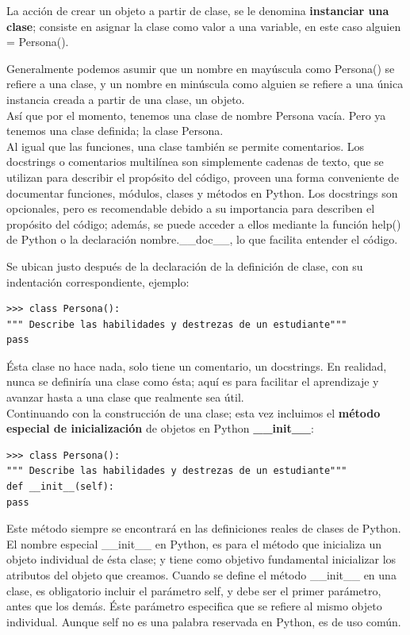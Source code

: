 La acción de crear un objeto a partir de clase, se le denomina {\bf instanciar una clase}; consiste en asignar la clase como valor a una variable, en este caso {\ttfamily alguien = Persona()}.  

Generalmente podemos asumir que un nombre en mayúscula como {\ttfamily Persona()} se refiere a una clase, y un nombre en minúscula como {\ttfamily alguien} se refiere a una única instancia creada a partir de una clase, un objeto. \\


Así que por el momento, tenemos una clase de nombre {\ttfamily Persona} vacía.  Pero ya tenemos una clase definida; la clase {\ttfamily Persona}. \\


Al igual que las funciones, una clase también se permite comentarios. Los docstrings o comentarios multilínea  son simplemente cadenas de texto, que se utilizan para describir el propósito del código,  proveen una forma conveniente de documentar funciones, módulos, clases y métodos en Python. Los docstrings son opcionales, pero es recomendable debido a su  importancia para describen el propósito del código; además,  se  puede acceder a ellos mediante la función {\ttfamily help()} de Python o la declaración  {\ttfamily nombre.\_\!\_doc\_\!\_}, lo que facilita   entender el código. 

Se ubican justo después de la declaración de la definición de clase, con su indentación correspondiente, ejemplo:

\begin{lstlisting}
>>> class Persona():
""" Describe las habilidades y destrezas de un estudiante"""
pass
\end{lstlisting}
Ésta clase no hace nada, solo tiene un comentario, un docstrings. 
En realidad, nunca se definiría una clase como ésta; aquí es para facilitar el aprendizaje y avanzar hasta a  una clase que realmente sea útil.\\

Continuando con la construcción de una clase; esta vez incluimos el {\bf método especial de inicialización} de objetos en Python {\bf {\ttfamily\_\!\_init\_\!\_}}:

\begin{lstlisting}
>>> class Persona():
""" Describe las habilidades y destrezas de un estudiante"""
def __init__(self):
pass
\end{lstlisting}

Este método siempre se encontrará en las definiciones reales de clases de Python. El nombre especial {\ttfamily\_\!\_init\_\!\_}  en Python, es para el método que inicializa un objeto individual de ésta clase; y tiene como objetivo fundamental inicializar los atributos del objeto que creamos. Cuando se  define el método {\ttfamily\_\!\_init\_\!\_} en una clase, es obligatorio incluir el parámetro {\ttfamily self}, y debe ser el primer parámetro, antes que los demás. Éste parámetro especifica que se refiere al mismo objeto individual.  Aunque {\ttfamily self} no es una palabra reservada en Python, es de uso común.\\

